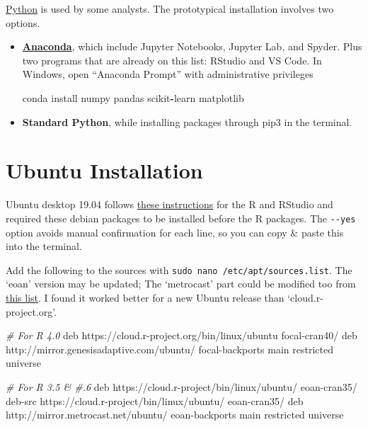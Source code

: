 \documentclass[
]{book}
\newenvironment{Shaded}{\begin{snugshade}}{\end{snugshade}}
\newcommand{\CommentTok}[1]{\textcolor[rgb]{0.56,0.35,0.01}{\textit{#1}}}
\newcommand{\ExtensionTok}[1]{#1}
\newcommand{\NormalTok}[1]{#1}
\newcommand{\OperatorTok}[1]{\textcolor[rgb]{0.81,0.36,0.00}{\textbf{#1}}}
\begin{document}
\href{https://www.python.org/}{Python} is used by some analysts. The prototypical installation involves two options.

\begin{itemize}
\item
  \textbf{\href{https://www.anaconda.com/distribution/\#download-section}{Anaconda}}, which include Jupyter Notebooks, Jupyter Lab, and Spyder. Plus two programs that are already on this list: RStudio and VS Code. In Windows, open ``Anaconda Prompt'' with administrative privileges

\begin{Shaded}
\begin{Highlighting}[]
\NormalTok{conda install numpy pandas scikit}\OperatorTok{{-}}\NormalTok{learn matplotlib}
\end{Highlighting}
\end{Shaded}
\item
  \textbf{Standard Python}, while installing packages through pip3 in the terminal.
\end{itemize}

\hypertarget{workstation-ubuntu}{%
\section{Ubuntu Installation}\label{workstation-ubuntu}}

Ubuntu desktop 19.04 follows \href{https://askubuntu.com/a/862520/153921}{these instructions} for the R and RStudio and required these debian packages to be installed before the R packages. The \texttt{-\/-yes} option avoids manual confirmation for each line, so you can copy \& paste this into the terminal.

Add the following to the sources with \texttt{sudo\ nano\ /etc/apt/sources.list}. The `eoan' version may be updated; The `metrocast' part could be modified too from \href{https://launchpad.net/ubuntu/+archivemirrors}{this list}. I found it worked better for a new Ubuntu release than `cloud.r-project.org'.

\begin{Shaded}
\begin{Highlighting}[]
\CommentTok{\# For R 4.0}
\ExtensionTok{deb}\NormalTok{ https://cloud.r{-}project.org/bin/linux/ubuntu focal{-}cran40/}
\ExtensionTok{deb}\NormalTok{ http://mirror.genesisadaptive.com/ubuntu/ focal{-}backports main restricted universe}

\CommentTok{\# For R 3.5 \& \#.6}
\ExtensionTok{deb}\NormalTok{ https://cloud.r{-}project/bin/linux/ubuntu/ eoan{-}cran35/}
\ExtensionTok{deb{-}src}\NormalTok{ https://cloud.r{-}project/bin/linux/ubuntu/ eoan{-}cran35/}
\ExtensionTok{deb}\NormalTok{ http://mirror.metrocast.net/ubuntu/ eoan{-}backports main restricted universe}
\end{Highlighting}
\end{Shaded}
\end{document}
